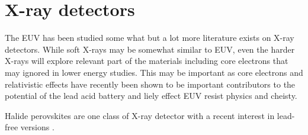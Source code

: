 \section{X-ray detectors }

The EUV has been studied some what but a lot more literature
exists on X-ray detectors. While soft X-rays may be somewhat
similar to EUV, even the harder X-rays will explore relevant
part of the materials including core electrons that may 
ignored in lower energy studies. This may be important as
core electrons and relativistic effects have recently been shown
to be important contributors to the potential of the lead
acid battery and liely effect EUV resist physics and cheisty.

Halide perovskites are one class of X-ray detector
with a recent interest in lead-free versions
\cite{doi:10.1021/acsaom.4c00265}.





